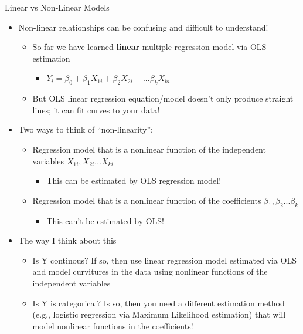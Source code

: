 \documentclass[
  8pt,
  ignorenonframetext,
  dvipsnames]{beamer}
\providecommand{\tightlist}{%
  \setlength{\itemsep}{0pt}\setlength{\parskip}{0pt}}
\renewcommand{\textbf}[1]{{\color{darkgray}\bfseries\fontfamily{Montserrat-TOsF}#1}}
\let\olditem\item
\renewcommand{\item}{%
  \olditem\vspace{4pt}
}
\begin{document}
\begin{frame}{Linear vs Non-Linear Models}
\protect\hypertarget{linear-vs-non-linear-models}{}

\begin{itemize}
\tightlist
\item
  Non-linear relationships can be confusing and difficult to understand!

  \begin{itemize}
  \tightlist
  \item
    So far we have learned \textbf{linear} multiple regression model via
    OLS estimation

    \begin{itemize}
    \tightlist
    \item
      \(Y_i = \beta_0 + \beta_1X_{1i} + \beta_2X_{2i} + ... \beta_kX_{ki}\)
    \end{itemize}
  \item
    But OLS linear regression equation/model doesn't only produce
    straight lines; it can fit curves to your data!
  \end{itemize}
\item
  Two ways to think of ``non-linearity'':

  \begin{itemize}
  \tightlist
  \item
    Regression model that is a nonlinear function of the independent
    variables \(X_{1i}, X_{2i}... X_{ki}\)

    \begin{itemize}
    \tightlist
    \item
      This can be estimated by OLS regression model!
    \end{itemize}
  \item
    Regression model that is a nonlinear function of the coefficients
    \(\beta_1, \beta_2... \beta_k\)

    \begin{itemize}
    \tightlist
    \item
      This can't be estimated by OLS!
    \end{itemize}
  \end{itemize}
\item
  The way I think about this

  \begin{itemize}
  \tightlist
  \item
    Is Y continous? If so, then use linear regression model estimated
    via OLS and model curvitures in the data using nonlinear functions
    of the independent variables
  \item
    Is Y is categorical? Is so, then you need a different estimation
    method (e.g., logistic regression via Maximum Likelihood estimation)
    that will model nonlinear functions in the coefficients!


\end{itemize}
\end{itemize}
\end{frame}
\end{document}
